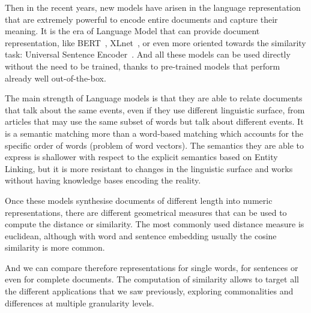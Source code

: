 Then in the recent years, new models have arisen in the language representation that are extremely powerful to encode entire documents and capture their meaning. It is the
era of
Language Model that can provide document representation, like BERT~\cite{devlin2018bert}, XLnet~\cite{yang2019xlnet}, or even more oriented towards the similarity task: Universal Sentence Encoder~\cite{cer2018universal}.
And all these models can be used directly without the need to be trained, thanks to pre-trained models that perform already well out-of-the-box.

The main strength of Language models is that they are able to
relate documents that talk about the same events, even if they use different linguistic surface, from articles that may use the same subset of words but talk about different events.
It is a semantic matching more than a word-based matching which accounts for the specific order of words (problem of word vectors). 
The semantics they are able to express
is shallower with respect to the explicit semantics based on Entity Linking, but it is more resistant to changes in the linguistic surface and works without having knowledge bases encoding the reality.










Once these models synthesise documents of different length into numeric representations, there are different geometrical measures that can be used to compute the distance or similarity.
The most commonly used distance measure is euclidean, although with word and sentence embedding usually the cosine similarity is more common.

And we can compare therefore representations for single words, for sentences or even for complete documents.
The computation of similarity allows to target all the different applications that we saw previously, exploring commonalities and differences at multiple granularity levels.


